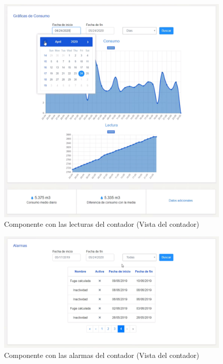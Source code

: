 \documentclass[pdftex,11pt,a4paper]{book}
\begin{document}
 \begin{figure}[H]
 \centering
 \includegraphics [scale=0.39] {images/vistas/lecturas-componentes.png}
 \caption{Componente con las lecturas del contador (Vista del contador)} \label{fig:vista-lecturas}
 \end{figure}

 \begin{figure}[H]
 \centering
 \includegraphics [scale=0.50] {images/vistas/alarmas.png}
 \caption{Componente con las alarmas del contador (Vista del contador)} \label{fig:vista-alarmas}
 \end{figure}
\end{document}

